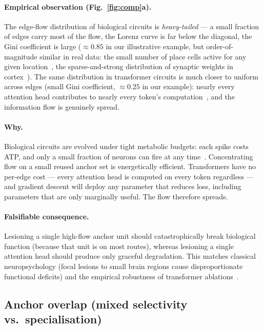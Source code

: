 \documentclass[11pt,a4paper]{article}
\begin{document}
\paragraph{Empirical observation (Fig.~\ref{fig:comp}a).}
The edge-flow distribution of biological circuits is \emph{heavy-tailed}
--- a small fraction of edges carry most of the flow, the Lorenz
curve is far below the diagonal, the Gini coefficient is large
($\approx 0.85$ in our illustrative example, but order-of-magnitude
similar in real data: the small number of place cells active for any
given location~\cite{barnes1990}, the sparse-and-strong distribution
of synaptic weights in cortex~\cite{song2005}). The same distribution
in transformer circuits is much closer to uniform across edges (small
Gini coefficient, $\approx 0.25$ in our example): nearly every
attention head contributes to nearly every token's
computation~\cite{voita2019heads,michel2019sixteen}, and the
information flow is genuinely spread.

\paragraph{Why.} Biological circuits are evolved under tight metabolic
budgets: each spike costs ATP, and only a small fraction of neurons
can fire at any time~\cite{lennie2003cost,laughlin1998metabolic}.
Concentrating flow on a small reused anchor set is energetically
efficient. Transformers have no per-edge cost --- every attention
head is computed on every token regardless --- and gradient descent
will deploy any parameter that reduces loss, including parameters
that are only marginally useful. The flow therefore spreads.

\paragraph{Falsifiable consequence.} Lesioning a single high-flow
anchor unit should catastrophically break biological function
(because that unit is on most routes), whereas lesioning a single
attention head should produce only graceful degradation. This matches
classical neuropsychology (focal lesions to small brain regions
cause disproportionate functional deficits) and the empirical
robustness of transformer ablations~\cite{voita2019heads,mcgrath2023hydra}.

\subsection{Anchor overlap (mixed selectivity vs.\ specialisation)}
\end{document}
